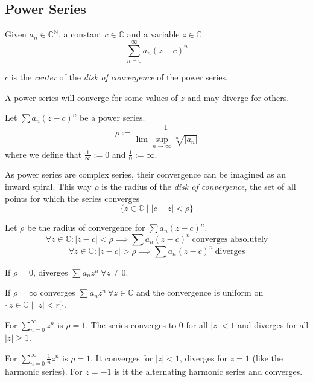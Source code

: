 \subsection{Power Series}
\begin{definition}\label{def:power_series}
   Given \(a_n \in \mathbb{C}^\mathbb{N}\), a constant \(c \in \mathbb{C}\) and a variable \(z \in \mathbb{C}\)
   \[\sum_{n=0}^\infty a_n (z - c)^n\]
\end{definition}
\begin{remark}[Terminology]
   \(c\) is the \emph{center} of the \emph{disk of convergence} of the power series.
\end{remark}
A power series will converge for some values of \(z\) and may diverge for others.
\begin{theorem}
   Let \(\sum a_n (z - c)^n\) be a power series.
   \[\rho := \frac{1}{\lim\sup_{n \to \infty} \sqrt[n]{|a_n|}}\]
   where we define that \(\frac{1}{\infty} := 0\) and \(\frac{1}{0} := \infty\).
\end{theorem}
\begin{remark}[Intuition]
   As power series are complex series, their convergence can be imagined as an inward spiral.
   This way \(\rho\) is the radius of the \emph{disk of convergence}, the set of all points for which the series converges
   \[\{z \in \mathbb{C} \mid |c - z| < \rho\}\]
\end{remark}

%    

\begin{theorem}\label{thm:conv_radius}
   Let \(\rho\) be the radius of convergence for \(\sum a_n (z-c)^n\).
   \[\forall z \in \mathbb{C}: \lvert z-c\rvert < \rho \implies \sum a_n (z-c)^n~\text{converges absolutely}\]
   \[\forall z \in \mathbb{C}: \lvert z-c\rvert > \rho \implies \sum a_n (z-c)^n~\text{diverges}\]
\end{theorem}
\begin{remark}
   If \(\rho = 0\), diverges \(\sum a_nz^n~\forall z \neq 0\).

   If \(\rho = \infty\) converges \(\sum a_nz^n~\forall z \in \mathbb{C}\) and the convergence is uniform on \(\{z \in \mathbb{C} \mid |z| < r\}\).
\end{remark}
\begin{example}
   For \(\sum_{n=0}^\infty z^n\) is \(\rho = 1\).
   The series converges to 0 for all \(|z| < 1\) and diverges for all \(|z| \geq 1\).
\end{example}
\begin{example}
   For \(\sum_{n=0}^\infty \frac{1}{n} z^n\) is \(\rho = 1\).
   It converges for \(|z| < 1\), diverges for \(z = 1\) (like the harmonic series).
   For \(z = -1\) is it the alternating harmonic series and converges.
\end{example}


